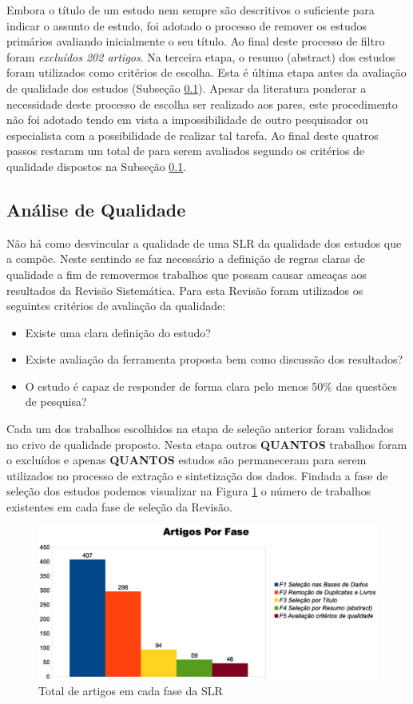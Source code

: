 \documentclass[12pt]{article}
\begin{document}
Embora o título de um estudo nem sempre são descritivos o suficiente para
indicar o assunto de estudo, foi adotado o processo de remover os estudos
primários avaliando inicialmente o seu título. Ao final deste processo de
filtro foram \textit{excluídos 202 artigos}. Na terceira etapa, o resumo
(abstract) dos estudos foram utilizados como critérios de escolha. Esta é
última etapa antes da avaliação de qualidade dos estudos (Subseção
\ref{subsec:analise-qualidade}). Apesar da literatura ponderar a necessidade
deste processo de escolha ser realizado aos pares, este procedimento não foi
adotado tendo em vista a impossibilidade de outro pesquisador ou especialista
com a possibilidade de realizar tal tarefa. Ao final deste quatros passos
restaram um total de para serem avaliados segundo os critérios de qualidade
dispostos na Subseção \ref{subsec:analise-qualidade}.

\subsection{Análise de Qualidade}
\label{subsec:analise-qualidade}
Não há como desvincular a qualidade de uma SLR da qualidade dos estudos que a
compõe. Neste sentindo se faz necessário a definição de regras claras de
qualidade a fim de removermos trabalhos que possam causar ameaças aos
resultados da Revisão Sistemática. Para esta Revisão foram utilizados os
seguintes critérios de avaliação da qualidade:

\begin{itemize}
\item Existe uma clara definição do estudo?
\item Existe avaliação da ferramenta proposta bem como discussão dos resultados?
\item O estudo é capaz de responder de forma clara pelo menos 50\% das questões
  de pesquisa?
\end{itemize}

Cada um dos trabalhos escolhidos na etapa de seleção anterior foram validados
no crivo de qualidade proposto. Nesta etapa outros \textbf{QUANTOS}
trabalhos foram o excluídos e apenas \textbf{QUANTOS} estudos são permaneceram
para serem utilizados no processo de extração e sintetização dos dados. Findada
a fase de seleção dos estudos podemos visualizar na  Figura \ref{fig:fases}
o número de trabalhos existentes em cada fase de seleção da Revisão.

\begin{figure}[htb]
\centering
\includegraphics[width=.75\textwidth]{../img/graph_fases.eps}
\caption{Total de artigos em cada fase da SLR}
\label{fig:fases}
\end{figure}
\end{document}
